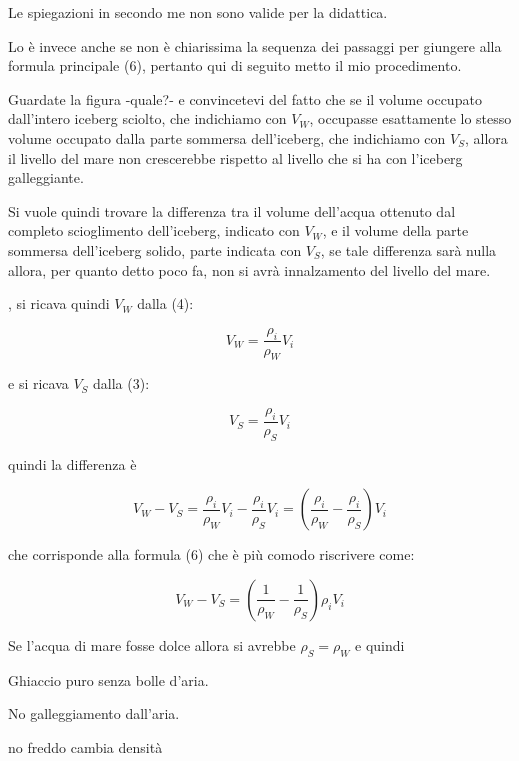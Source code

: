\documentclass[a4paper]{article}
\begin{document}
Le spiegazioni in \citet{noerdlinger_melting_2007,jenkins_melting_2007} secondo me non sono valide per la didattica.

Lo è invece \cite{lan_does_2010} anche se non è chiarissima la sequenza dei passaggi per giungere alla formula principale (6), 
pertanto qui di seguito metto il mio procedimento.

Guardate la figura -quale?- e convincetevi del fatto che se il volume occupato dall'intero iceberg sciolto, 
che indichiamo con $V_W$, occupasse esattamente lo stesso volume occupato dalla parte sommersa dell'iceberg, 
che indichiamo con $V_S$, allora il livello del mare non crescerebbe rispetto al livello che si ha con 
l'iceberg galleggiante.

Si vuole quindi trovare la differenza tra il volume dell'acqua ottenuto dal completo scioglimento dell'iceberg, indicato con $V_W$,
e il volume della parte sommersa dell'iceberg solido, parte indicata con $V_S$, se tale differenza sarà nulla allora, per quanto
detto poco fa, non si avrà innalzamento del livello del mare.

, si ricava quindi $V_W$ dalla (4):

\[V_W=\frac{\rho_i}{\rho_W}V_i\]

e si ricava $V_S$ dalla (3):

\[V_S=\frac{\rho_i}{\rho_S}V_i\]

quindi la differenza è

\[V_W-V_S=\frac{\rho_i}{\rho_W}V_i-\frac{\rho_i}{\rho_S}V_i=(\frac{\rho_i}{\rho_W}-\frac{\rho_i}{\rho_S})V_i\]

che corrisponde alla formula (6) che è più comodo riscrivere come:

\[V_W-V_S=(\frac{1}{\rho_W}-\frac{1}{\rho_S})\rho_i V_i\]



Se l'acqua di mare fosse dolce allora si avrebbe $\rho_S=\rho_W$ e quindi


Ghiaccio puro senza bolle d'aria.

No galleggiamento dall'aria.

no freddo cambia densità









\begin{small}
 
\end{small}
\end{document}
